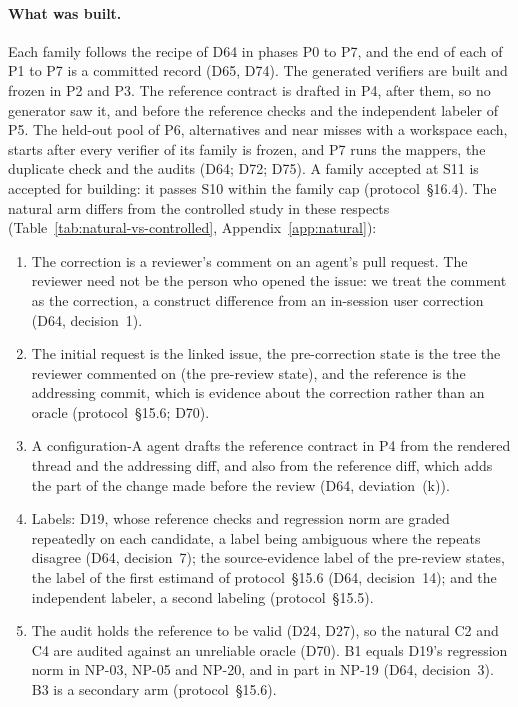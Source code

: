 \paragraph{What was built.}
Each family follows the recipe of D64 in phases P0 to P7, and the end of each of P1 to P7 is a committed record (D65,
D74). The generated verifiers are built and frozen in P2 and P3. The reference contract is drafted in P4, after them, so
no generator saw it, and before the reference checks and the independent labeler of P5. The held-out pool of P6,
alternatives and near misses with a workspace each, starts after every verifier of its family is frozen, and P7 runs the
mappers, the duplicate check and the audits (D64; D72; D75). A family accepted at S11 is accepted for building: it passes
S10 within the family cap (protocol~\S16.4). The natural arm differs from the controlled study in these respects
(Table~\ref{tab:natural-vs-controlled}, Appendix~\ref{app:natural}):
\begin{enumerate}
\item The correction is a reviewer's comment on an agent's pull request. The reviewer need not be the person who opened
  the issue: we treat the comment as the correction, a construct difference from an in-session user correction (D64,
  decision~1).
\item The initial request is the linked issue, the pre-correction state is the tree the reviewer commented on (the
  pre-review state), and the reference is the addressing commit, which is evidence about the correction rather than an
  oracle (protocol~\S15.6; D70).
\item A configuration-A agent drafts the reference contract in P4 from the rendered thread and the addressing diff, and
  also from the reference diff, which adds the part of the change made before the review (D64, deviation~(k)).
\item Labels: D19, whose reference checks and regression norm are graded repeatedly on each candidate, a label being
  ambiguous where the repeats disagree (D64, decision~7); the source-evidence label of the pre-review states, the label
  of the first estimand of protocol~\S15.6 (D64, decision~14); and the independent labeler, a second labeling
  (protocol~\S15.5).
\item The audit holds the reference to be valid (D24, D27), so the natural C2 and C4 are audited against an unreliable
  oracle (D70). B1 equals D19's regression norm in NP-03, NP-05 and NP-20, and in part in NP-19 (D64, decision~3). B3
  is a secondary arm (protocol~\S15.6).
\end{enumerate}

